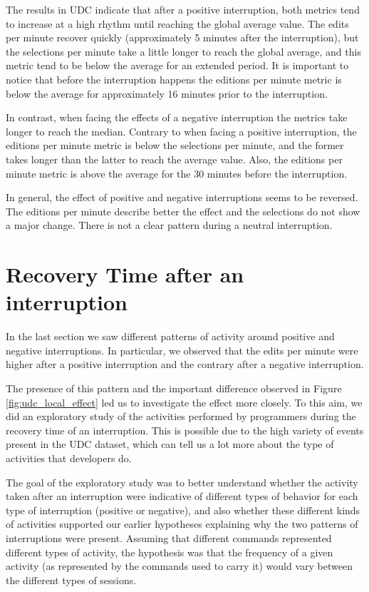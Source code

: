 \begin{table}[ht!]
\begin{tabular}{m{6cm} | m{6cm}}
		\\
	\end{tabular}
\end{table}

The results in UDC indicate that after a positive interruption, both metrics tend to increase at a high rhythm until reaching the global average value. The edits per minute recover quickly (approximately 5 minutes after the interruption), but the selections per minute take a little longer to reach the global average, and this metric tend to be below the average for an extended period. It is important to notice that before the interruption happens the editions per minute metric is below the average for approximately 16 minutes prior to the interruption.

In contrast, when facing the effects of a negative interruption the metrics take longer to reach the median. Contrary to when facing a positive interruption, the editions per minute metric is below the selections per minute, and the former takes longer than the latter to reach the average value. Also, the editions per minute metric is above the average for the 30 minutes before the interruption. 

In general, the effect of positive and negative interruptions seems to be reversed. The editions per minute describe better the effect and the selections do not show a major change. There is not a clear pattern during a neutral interruption.

\section{Recovery Time after an interruption}

In the last section we saw different patterns of activity around positive and negative interruptions. In particular, we observed that the edits per minute were higher after a positive interruption and the contrary after a negative interruption.

The presence of this pattern and the important difference observed in Figure \ref{fig:udc_local_effect} led us to investigate the effect more closely. To this aim, we did an exploratory study of the activities performed by programmers during the recovery time of an interruption. This is possible due to the high variety of events present in the UDC dataset, which can tell us a lot more about the type of activities that developers do.

The goal of the exploratory study was to better understand whether the activity taken after an interruption were indicative of different types of behavior for each type of interruption (positive or negative), and also whether these different kinds of activities supported our earlier hypotheses explaining why the two patterns of interruptions were present. Assuming that different commands represented different types of activity, the hypothesis was that the frequency of a given activity (as represented by the commands used to carry it) would vary between the different types of sessions.

